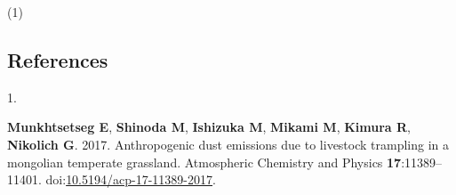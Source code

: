 \documentclass[
  11pt,
]{article}
\newlength{\cslhangindent}
\newlength{\csllabelwidth}
\newenvironment{CSLReferences}[2] %
 {\begin{list}{}{%
  \setlength{\itemindent}{0pt}
  \setlength{\leftmargin}{0pt}
  \setlength{\parsep}{0pt}
  \ifodd #1
   \setlength{\leftmargin}{\cslhangindent}
   \setlength{\itemindent}{-1\cslhangindent}
  \fi
  \setlength{\itemsep}{#2\baselineskip}}}
 {\end{list}}
\newcommand{\CSLLeftMargin}[1]{\parbox[t]{\csllabelwidth}{\strut#1\strut}}
\newcommand{\CSLRightInline}[1]{\parbox[t]{\linewidth - \csllabelwidth}{\strut#1\strut}}
\begin{document}
(1)

\newpage

\subsection*{References}\label{references}

\label{refs}
\begin{CSLReferences}{0}{1}
\CSLLeftMargin{1. }%
\CSLRightInline{\textbf{Munkhtsetseg E}, \textbf{Shinoda M},
\textbf{Ishizuka M}, \textbf{Mikami M}, \textbf{Kimura R},
\textbf{Nikolich G}. 2017. Anthropogenic dust emissions due to livestock
trampling in a mongolian temperate grassland. Atmospheric Chemistry and
Physics \textbf{17}:11389--11401.
doi:\href{https://doi.org/10.5194/acp-17-11389-2017}{10.5194/acp-17-11389-2017}.}

\end{CSLReferences}
\end{document}

